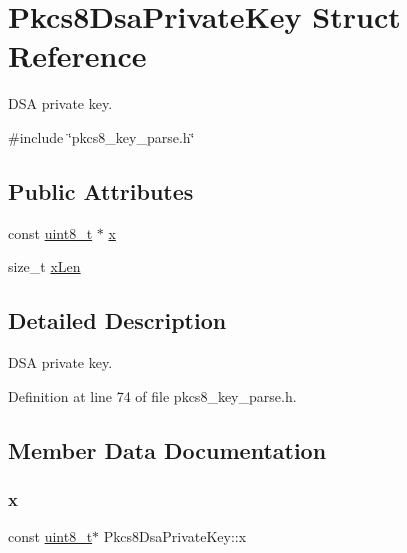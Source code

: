\hypertarget{structPkcs8DsaPrivateKey}{}\section{Pkcs8\+Dsa\+Private\+Key Struct Reference}
\label{structPkcs8DsaPrivateKey}


D\+SA private key.  




{\ttfamily \#include \char`\"{}pkcs8\+\_\+key\+\_\+parse.\+h\char`\"{}}

\subsection*{Public Attributes}
\begin{DoxyCompactItemize}
\item 
const \hyperlink{stdint_8h_aba7bc1797add20fe3efdf37ced1182c5}{uint8\+\_\+t} $\ast$ \hyperlink{structPkcs8DsaPrivateKey_a35b665fbe2d994f619b5f5411c9862df}{x}
\item 
size\+\_\+t \hyperlink{structPkcs8DsaPrivateKey_ae432d960efd869f6cda9c91fa0e0e408}{x\+Len}
\end{DoxyCompactItemize}


\subsection{Detailed Description}
D\+SA private key. 

Definition at line 74 of file pkcs8\+\_\+key\+\_\+parse.\+h.



\subsection{Member Data Documentation}
\mbox{\label{structPkcs8DsaPrivateKey_a35b665fbe2d994f619b5f5411c9862df}} 
\subsubsection{\texorpdfstring{x}{x}}
{\footnotesize\ttfamily const \hyperlink{stdint_8h_aba7bc1797add20fe3efdf37ced1182c5}{uint8\+\_\+t}$\ast$ Pkcs8\+Dsa\+Private\+Key\+::x}



